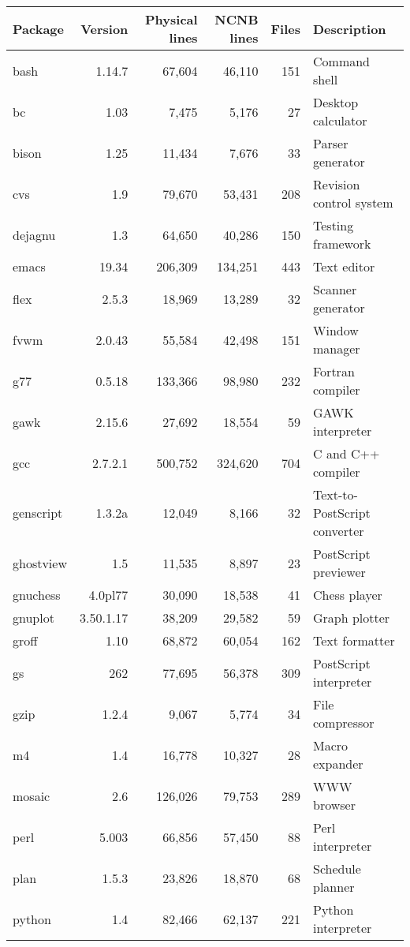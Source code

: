 \begin{tabular}{|l|r|r|r|r|l|}\hline
Package & Version & Physical lines & NCNB lines & Files & Description\\\hline\hline
bash & 1.14.7 & 67,604 & 46,110 & 151 & Command shell \\\hline
bc & 1.03 & 7,475 & 5,176 & 27 & Desktop calculator \\\hline
bison & 1.25 & 11,434 & 7,676 & 33 & Parser generator \\\hline
cvs & 1.9 & 79,670 & 53,431 & 208 & Revision control system \\\hline
dejagnu & 1.3 & 64,650 & 40,286 & 150 & Testing framework \\\hline
emacs & 19.34 & 206,309 & 134,251 & 443 & Text editor\\\hline
flex & 2.5.3 & 18,969 & 13,289 & 32 & Scanner generator \\\hline
fvwm & 2.0.43 & 55,584 & 42,498 & 151 & Window manager \\\hline
g77 & 0.5.18 & 133,366 & 98,980 & 232 & Fortran compiler \\\hline
gawk & 2.15.6 & 27,692 & 18,554 & 59 & GAWK interpreter \\\hline
gcc & 2.7.2.1 & 500,752 & 324,620 & 704 & C and C++ compiler\\\hline
genscript & 1.3.2a & 12,049 & 8,166 & 32 & Text-to-PostScript converter \\\hline
ghostview & 1.5 & 11,535 & 8,897 & 23 & PostScript previewer \\\hline
gnuchess & 4.0pl77 & 30,090 & 18,538 & 41 & Chess player \\\hline
gnuplot & 3.50.1.17 & 38,209 & 29,582 & 59 & Graph plotter \\\hline
groff & 1.10 & 68,872 & 60,054 & 162 & Text formatter \\\hline
gs & 262 & 77,695 & 56,378 & 309 & PostScript interpreter \\\hline
gzip & 1.2.4 & 9,067 & 5,774 & 34 & File compressor \\\hline
m4 & 1.4 & 16,778 & 10,327 & 28 & Macro expander \\\hline
mosaic & 2.6 & 126,026 & 79,753 & 289 & WWW browser\\\hline
perl & 5.003 & 66,856 & 57,450 & 88 & Perl interpreter \\\hline
plan & 1.5.3 & 23,826 & 18,870 & 68 & Schedule planner \\\hline
python & 1.4 & 82,466 & 62,137 & 221 & Python interpreter \\\hline

\end{tabular}
